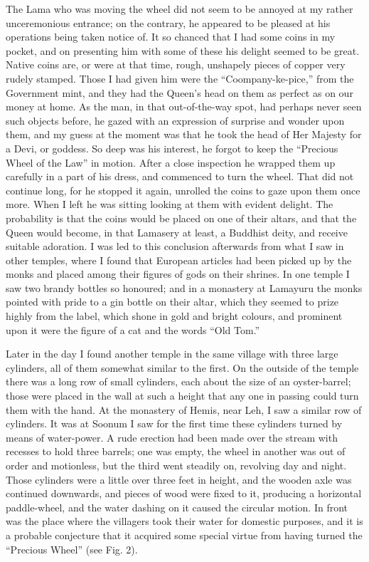 \documentclass[a4paper, 11pt, oneside, polutonikogreek, english]{article}
\begin{document}
The Lama who was moving the wheel did not seem to be annoyed at my rather unceremonious entrance; on the contrary, he appeared to be pleased at his operations being taken notice of. It so chanced that I had some coins in my pocket, and on presenting him with some of these his delight seemed to be great. Native coins are, or were at that time, rough, unshapely pieces of copper very rudely stamped. Those I had given him were the ``Coompany-ke-pice,'' from the Government mint, and they had the Queen's head on them as perfect as on our money at home. As the man, in that out-of-the-way spot, had perhaps never seen such objects before, he gazed with an expression of surprise and wonder upon them, and my guess at the moment was that he took the head of Her Majesty for a Devi, or goddess. So deep was his interest, he forgot to keep the ``Precious Wheel of the Law'' in motion. After a close inspection he wrapped them up carefully in a part of his dress, and commenced to turn the wheel. That did not continue long, for he stopped it again, unrolled the coins to gaze upon them once more. When I left he was sitting looking at them with evident delight. The probability is that the coins would be placed on one of their altars, and that the Queen would become, in that Lamasery at least, a Buddhist deity, and receive suitable adoration. I was led to this conclusion afterwards from what I saw in other temples, where I found that European articles had been picked up by the monks and placed among their figures of gods on their shrines. In one temple I saw two brandy bottles so honoured; and in a monastery at Lamayuru the monks pointed with pride to a gin bottle on their altar, which they seemed to prize highly from the label, which shone in gold and bright colours, and prominent upon it were the figure of a cat and the words ``Old Tom.''

Later in the day I found another temple in the same village with three large cylinders, all of them somewhat similar to the first. On the outside of the temple there was a long row of small cylinders, each about the size of an oyster-barrel; those were placed in the wall at such a height that any one in passing could turn them with the hand. At the monastery of Hemis, near Leh, I saw a similar row of cylinders. It was at Soonum I saw for the first time these cylinders turned by means of water-power. A rude erection had been made over the stream with recesses to hold three barrels; one was empty, the wheel in another was out of order and motionless, but the third went steadily on, revolving day and night. Those cylinders were a little over three feet in height, and the wooden axle was continued downwards, and pieces of wood were fixed to it, producing a horizontal paddle-wheel, and the water dashing on it caused the circular motion. In front was the place where the villagers took their water for domestic purposes, and it is a probable conjecture that it acquired some special virtue from having turned the ``Precious Wheel'' (see Fig. 2).
\end{document}
